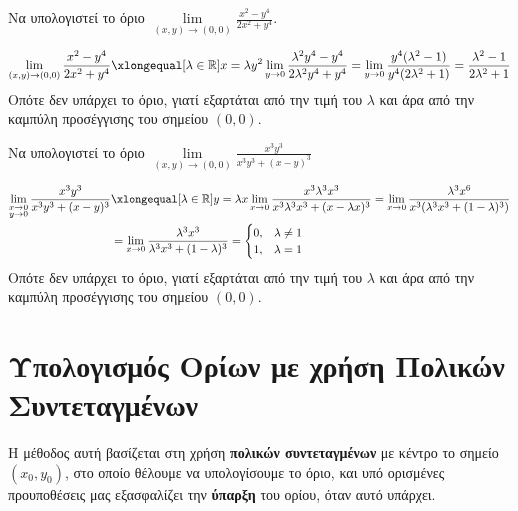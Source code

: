 \documentclass[a4paper,11pt]{report}
\begin{document}
\begin{example}
  Να υπολογιστεί το όριο $ \lim\limits_{(x,y)\to (0, 0)} \frac{x^{2}-y^{4}}
  {2x^{2}+y^{4}} $. 
  \begin{solution}
    \[
      \lim\limits_{(x,y)\to (0, 0)} \frac{x^{2}-y^{4}}
      {2x^{2}+y^{4}} \xlongequal[\lambda \in \mathbb{R}]
      {x= \lambda y^{2}} \lim_{y \to 0} 
      \frac{\lambda ^{2}y^{4}-y^{4}}{2 \lambda ^{2}y^{4}+y^{4}} = 
      \lim_{y \to 0} \frac{y^{4}(\lambda ^{2}-1)}
      {y^{4}(2 \lambda ^{2}+1)} = 
      \frac{\lambda ^{2}-1}{2 \lambda ^{2}+1} 
    \] 
    Οπότε δεν υπάρχει το όριο, γιατί εξαρτάται από την τιμή του $ \lambda $ 
    και άρα από την καμπύλη προσέγγισης του σημείου $ (0,0) $.
  \end{solution}
\end{example}

\begin{example}
  Να υπολογιστεί το όριο 
  $ \lim\limits_{(x,y)\to (0, 0)} \frac{x^{3}y^{3}}{x^{3}y^{3}+ (x-y)^{3}} $ 
  \begin{solution}
  \item {}
    \begin{align*}
      \lim\limits_{\substack{x \to 0\\ y \to 0}} \frac{x^{3}y^{3}}{x^{3}y^{3} + 
      (x-y)^{3}} 
    &\xlongequal[\lambda \in \mathbb{R}]{y = \lambda x} \lim_{x \to 0} \frac{x^{3} 
    \lambda ^{3} x^{3}}{x^{3} \lambda ^{3} x^{3} + (x - \lambda x)^{3}} 
    = \lim_{x \to 0} \frac{\lambda ^{3}x^{6}}{x^{3} 
    (\lambda ^{3} x^{3} + (1- \lambda)^{3})} \\
    &= \lim_{x \to 0} \frac{\lambda ^{3} x^{3}}{\lambda ^{3}x^{3} + (1- \lambda)^{3}} 
    = 
    \begin{cases} 
      0, & \lambda \neq 1 \\ 
      1, & \lambda = 1 
    \end{cases} 
    \end{align*} 
    Οπότε δεν υπάρχει το όριο, γιατί εξαρτάται από την τιμή του 
    $ \lambda $ και άρα από την καμπύλη προσέγγισης του σημείου 
    $ (0,0) $.
  \end{solution}
\end{example}


\section{Υπολογισμός Ορίων με χρήση Πολικών Συντεταγμένων}

Η μέθοδος αυτή βασίζεται στη χρήση \textbf{πολικών συντεταγμένων} με κέντρο το σημείο 
$ (x_{0}, y_{0}) $, στο οποίο θέλουμε να υπολογίσουμε το όριο, και υπό ορισμένες
προυποθέσεις μας εξασφαλίζει 
την \textbf{ύπαρξη} του ορίου, όταν αυτό υπάρχει.
\end{document}
